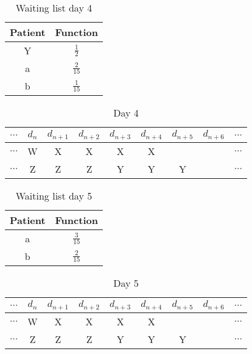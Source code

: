\begin{table}
\centering
\begin{tabular}{|c|c|}
	\hline
	Patient & Function\\
	\hline
	Y & $\frac{1}{2}$\\
	\hline
	a & $\frac{2}{15}$\\
	\hline
	b & $\frac{1}{15}$\\
	\hline
\end{tabular}
\caption{Waiting list day 4}
\end{table}

\begin{table}
\centering
\begin{tabular}{|c|c|c|c|c|c|c|c|c|}
	\multicolumn{1}{c}{$...$} & \multicolumn{1}{c}{$d_n$} & \multicolumn{1}{c}{$d_{n+1}$} & \multicolumn{1}{c}{$d_{n+2}$} & \multicolumn{1}{c}{$d_{n+3}$} & \multicolumn{1}{c}{$d_{n+4}$} & \multicolumn{1}{c}{$d_{n+5}$} & \multicolumn{1}{c}{$d_{n+6}$} & \multicolumn{1}{c}{$...$}\\
	\hline
	$...$ & W & X & X & X & X &   &   & $...$\\
	\hline
	$...$ & Z & Z & Z & Y & Y & Y &   & $...$\\
	\hline
\end{tabular}
\caption{Day 4}
\end{table}

\begin{table}
\centering
\begin{tabular}{|c|c|}
	\hline
	Patient & Function\\
	\hline
	a & $\frac{3}{15}$\\
	\hline
	b & $\frac{2}{15}$\\
	\hline
\end{tabular}
\caption{Waiting list day 5}
\end{table}

\begin{table}
\centering
\begin{tabular}{|c|c|c|c|c|c|c|c|c|}
	\multicolumn{1}{c}{$...$} & \multicolumn{1}{c}{$d_n$} & \multicolumn{1}{c}{$d_{n+1}$} & \multicolumn{1}{c}{$d_{n+2}$} & \multicolumn{1}{c}{$d_{n+3}$} & \multicolumn{1}{c}{$d_{n+4}$} & \multicolumn{1}{c}{$d_{n+5}$} & \multicolumn{1}{c}{$d_{n+6}$} & \multicolumn{1}{c}{$...$}\\
	\hline
	$...$ & W & X & X & X & X &   &   & $...$\\
	\hline
	$...$ & Z & Z & Z & Y & Y & Y &   & $...$\\
	\hline
\end{tabular}
\caption{Day 5}
\end{table}

